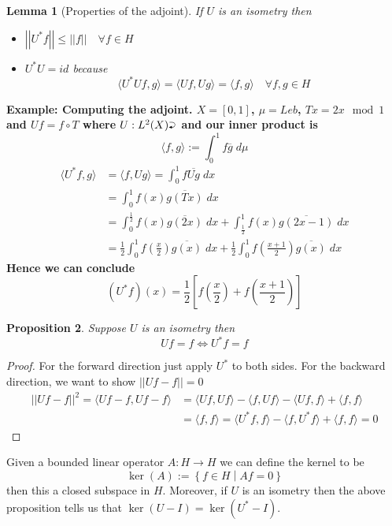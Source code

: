 \documentclass[11pt]{article}
\newcommand{\defeq}{:=}
\newcommand{\norm}[1]{\left|\left|#1\right|\right|}
\newcommand{\relmiddle}[1]{\mathrel{}\middle#1\mathrel{}}
\newcommand{\rmv}{\relmiddle|}
\newcommand{\toitself}{\mathbin{\scalebox{.85}{%
    \lefteqn{\scalebox{.5}{$\blacktriangleleft$}}\raisebox{.34ex}{$\supset$}}}}
\newcommand{\mdf}[1]{{\color{RoyalBlue} #1}}
\newenvironment{eg}
	{\begin{mdframed}[backgroundcolor=mylg,roundcorner=5pt,linewidth=0pt]\bfseries{Example:}\normalfont}
	{\end{mdframed}}
\newtheorem{prop}{Proposition}[section]
\newtheorem{lemma}[prop]{Lemma}
\begin{document}
\begin{lemma}[Properties of the adjoint]
If $U$ is an isometry then 
\begin{itemize}
	\item $\norm{U^\ast f} \leq \norm{f} \quad \forall f\in H$
	\item $U^\ast U = id $ because
		\[
		\langle U^\ast U f, g \rangle = \langle Uf, Ug\rangle = \langle f, g\rangle \quad \forall f,g \in H
		\]
\end{itemize}
\end{lemma}
\begin{eg}
	\textbf{Computing the adjoint.}
	$X=[0,1]$, $\mu=Leb$, $Tx=2x \mod 1$ and $Uf = f\circ T$ where $U:L^2(X)\toitself$ and our inner product is
	\[
		\langle f, g\rangle \defeq \int_0^1 f \overline{g} \; d\mu
	\]
	\begin{align*}
		\langle U^\ast f, g\rangle & = \langle f, Ug\rangle = \int_0^1 f \overline{Ug} \; dx \\
								   & = \int_0^1 f(x)\overline{g(Tx)}\; dx \\
								   & = \int_0^{\frac{1}{2}} f(x)\overline{g(2x)} \; dx + \int_{\frac{1}{2}}^1 f(x)\overline{g(2x-1)}\; dx \\
								   & = \frac{1}{2}\int_0^1 f\left( \frac{x}{2}\right)\overline{g(x)}\; dx + 
										\frac{1}{2}\int_0^1 f\left( \frac{x+1}{2}\right)\overline{g(x)}\; dx
	\end{align*}
	Hence we can conclude 
	\[
		(U^\ast f)(x) = \frac{1}{2}\left[ f \left( \frac{x}{2}\right) + f \left( \frac{x+1}{2}\right)\right]
	\]
\end{eg}

\begin{prop}
Suppose $U$ is an isometry then
\[
Uf=f \iff U^\ast f = f
\]
\end{prop}

\begin{proof}
For the forward direction just apply $U^\ast$ to both sides.
For the backward direction, we want to show $\norm{Uf - f}=0$
\begin{align*}
	\norm{Uf-f}^2 = \langle Uf -f, Uf -f\rangle
	&= \langle Uf, Uf\rangle - \langle f, Uf\rangle - \langle Uf, f\rangle + \langle f, f\rangle \\
	&= \langle f, f\rangle = \langle U^\ast f, f\rangle - \langle f, U^\ast f\rangle + \langle f, f\rangle=0
\end{align*}
\end{proof}

Given a bounded linear operator $A:H\to H$ we can define the \mdf{kernel} to be
\[
	\ker(A) \defeq \left\{ f\in H \rmv Af = 0\right\}
\]
then this a closed subspace in $H$.
Moreover, if $U$ is an isometry then the above proposition tells us that $\ker(U-I)=\ker(U^\ast - I)$.
\end{document}
